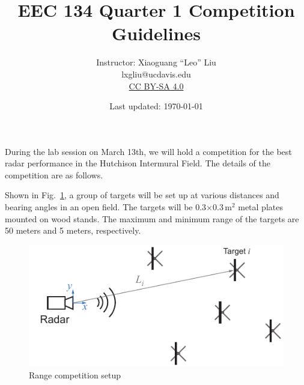 \documentclass[letterpaper, 11pt]{article}
\begin{document}
\title{EEC 134 Quarter 1 Competition Guidelines}
\author{Instructor: Xiaoguang ``Leo'' Liu\\lxgliu@ucdavis.edu \\
	\small \href{http://creativecommons.org/licenses/by-sa/4.0/}{CC BY-SA 4.0}}
\date{Last updated: \today}

\maketitle




	
During the lab session on March 13th, we will hold a competition for the best radar performance in the Hutchison Intermural Field. The details of the competition are as follows. 

Shown in Fig.~\ref{fig:range-competition}, a group of targets will be set up at various distances and bearing angles in an open field. The targets will be 0.3$\times$0.3\,m$^2$ metal plates mounted on wood stands. The maximum and minimum range of the targets are 50 meters and 5 meters, respectively. 

	\begin{figure}[h]
		\centering
		\includegraphics{range-competition}
		\caption{Range competition setup}
		\label{fig:range-competition}
	\end{figure}
\end{document}
